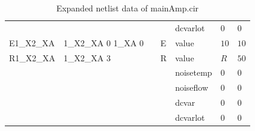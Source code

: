 \begin{table}[h]
\begin{tabular}[c]{lllllll}
\rowcolor{myyellow}
 & & & &\small{dcvarlot} &$0$ &$0$ \\ 
\small{E1\_X2\_XA} &\small{1\_X2\_XA 0 1\_XA 0 } & &\small{E} &\small{value} &$10$ &$10$ \\ 
\rowcolor{myyellow}
\small{R1\_X2\_XA} &\small{1\_X2\_XA 3 } & &\small{R} &\small{value} &$R$ &$50$ \\ 
 & & & &\small{noisetemp} &$0$ &$0$ \\ 
\rowcolor{myyellow}
 & & & &\small{noiseflow} &$0$ &$0$ \\ 
 & & & &\small{dcvar} &$0$ &$0$ \\ 
\rowcolor{myyellow}
 & & & &\small{dcvarlot} &$0$ &$0$ \\ 
\end{tabular}
\caption{Expanded netlist data of mainAmp.cir}
\end{table}

